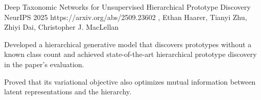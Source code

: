 \begin{samepage}
\CVPaperHeading
  {Deep Taxonomic Networks for Unsupervised Hierarchical Prototype Discovery}
  {NeurIPS 2025}
  {https://arxiv.org/abs/2509.23602}
  {\CVNameInAuthors, Ethan Haarer, Tianyi Zhu, Zhiyi Dai, Christopher J. MacLellan}
\begin{CVHighlights}
  \item Developed a hierarchical generative model that discovers prototypes
    without a known class count and achieved state-of-the-art hierarchical
    prototype discovery in the paper's evaluation.
  \item Proved that its variational objective also optimizes mutual information
    between latent representations and the hierarchy.
\end{CVHighlights}
\end{samepage}
\CVProjectGap
